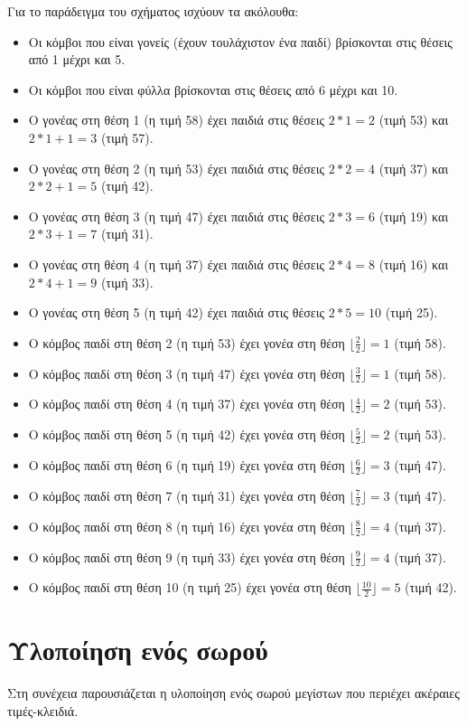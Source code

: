 Για το παράδειγμα του σχήματος ισχύουν τα ακόλουθα:
\begin{itemize}[noitemsep]
\item Οι κόμβοι που είναι γονείς (έχουν τουλάχιστον ένα παιδί) βρίσκονται στις θέσεις από 1 μέχρι και 5.
\item Οι κόμβοι που είναι φύλλα βρίσκονται στις θέσεις από 6 μέχρι και 10.
\item Ο γονέας στη θέση 1 (η τιμή 58) έχει παιδιά στις θέσεις $2*1=2$ (τιμή 53) και $2*1+1=3$ (τιμή 57).
\item Ο γονέας στη θέση 2 (η τιμή 53) έχει παιδιά στις θέσεις $2*2=4$ (τιμή 37) και $2*2+1=5$ (τιμή 42).
\item Ο γονέας στη θέση 3 (η τιμή 47) έχει παιδιά στις θέσεις $2*3=6$ (τιμή 19) και $2*3+1=7$ (τιμή 31).
\item Ο γονέας στη θέση 4 (η τιμή 37) έχει παιδιά στις θέσεις $2*4=8$ (τιμή 16) και $2*4+1=9$ (τιμή 33).
\item Ο γονέας στη θέση 5 (η τιμή 42) έχει παιδιά στις θέσεις $2*5=10$ (τιμή 25).
\item Ο κόμβος παιδί στη θέση 2 (η τιμή 53) έχει γονέα στη θέση $\lfloor{\frac{2}{2}}\rfloor=1$ (τιμή 58).
\item Ο κόμβος παιδί στη θέση 3 (η τιμή 47) έχει γονέα στη θέση $\lfloor{\frac{3}{2}}\rfloor=1$ (τιμή 58).
\item Ο κόμβος παιδί στη θέση 4 (η τιμή 37) έχει γονέα στη θέση $\lfloor{\frac{4}{2}}\rfloor=2$ (τιμή 53).
\item Ο κόμβος παιδί στη θέση 5 (η τιμή 42) έχει γονέα στη θέση $\lfloor{\frac{5}{2}}\rfloor=2$ (τιμή 53).
\item Ο κόμβος παιδί στη θέση 6 (η τιμή 19) έχει γονέα στη θέση $\lfloor{\frac{6}{2}}\rfloor=3$ (τιμή 47).
\item Ο κόμβος παιδί στη θέση 7 (η τιμή 31) έχει γονέα στη θέση $\lfloor{\frac{7}{2}}\rfloor=3$ (τιμή 47).
\item Ο κόμβος παιδί στη θέση 8 (η τιμή 16) έχει γονέα στη θέση $\lfloor{\frac{8}{2}}\rfloor=4$ (τιμή 37).
\item Ο κόμβος παιδί στη θέση 9 (η τιμή 33) έχει γονέα στη θέση $\lfloor{\frac{9}{2}}\rfloor=4$ (τιμή 37).
\item Ο κόμβος παιδί στη θέση 10 (η τιμή 25) έχει γονέα στη θέση $\lfloor{\frac{10}{2}}\rfloor=5$ (τιμή 42).
\end{itemize}

\section{Υλοποίηση ενός σωρού}
Στη συνέχεια παρουσιάζεται η υλοποίηση ενός σωρού μεγίστων που περιέχει ακέραιες τιμές-κλειδιά.

